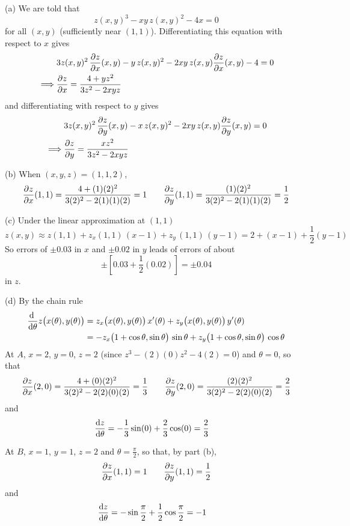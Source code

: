 \begin{solution}
(a)  We are told that
\begin{equation*}
z(x,y)^3 - xy\,z(x,y)^2 - 4x = 0
\end{equation*}
for all $(x,y)$ (sufficiently near $(1,1)$).
Differentiating this equation with respect to $x$ gives
\begin{align*}
& 3z(x,y)^2\,\pdiff{z}{x}(x,y) -y\, z(x,y)^2 -2xy\,z(x,y)\pdiff{z}{x}(x,y) - 4=0
\\ \implies 
&\pdiff{z}{x} = \frac{4+yz^2}{3z^2-2xyz}
\end{align*}
and differentiating with respect to $y$ gives
\begin{align*}
& 3z(x,y)^2\,\pdiff{z}{y}(x,y) -x\, z(x,y)^2 -2xy\,z(x,y)\pdiff{z}{y}(x,y) =0
\\ \implies 
&\pdiff{z}{y} = \frac{xz^2}{3z^2-2xyz}
\end{align*}

(b) 
When $(x,y,z)=(1,1,2)$,
\begin{align*}
\pdiff{z}{x}(1,1) = \frac{4+(1)(2)^2}{3(2)^2-2(1)(1)(2)} = 1\qquad
\pdiff{z}{y}(1,1) = \frac{(1)(2)^2}{3(2)^2-2(1)(1)(2)} = \frac{1}{2}
\end{align*}

(c) Under the linear approximation at $(1,1)$
\begin{equation*}
z(x,y) \approx z(1,1) + z_x(1,1)\,(x-1) + z_y\,(1,1)\,(y-1)
        = 2 + (x-1) +\frac{1}{2}(y-1)
\end{equation*}
So errors of $\pm 0.03$ in $x$ and $\pm 0.02$ in $y$ leads of errors
of about 
\begin{equation*}
\pm\left[0.03 + \frac{1}{2}(0.02)\right]
=\pm 0.04
\end{equation*}
in $z$.

(d) By the chain rule
\begin{align*}
\diff{}{\theta} z\big(x(\theta),y(\theta)\big)
&= z_x\big(x(\theta),y(\theta)\big)\,x'(\theta)
  +z_y\big(x(\theta),y(\theta)\big)\,y'(\theta) \\
&=-z_x\big(1 + \cos\theta,\sin\theta\big)\,\sin\theta
  +z_y\big(1 + \cos\theta,\sin\theta\big)\,\cos\theta
\end{align*}
At $A$, $x=2$, $y=0$, $z=2$ (since $z^3-(2)(0)z^2-4(2)=0$) and $\theta=0$, 
so that
\begin{align*}
\pdiff{z}{x}(2,0) = \frac{4+(0)(2)^2}{3(2)^2-2(2)(0)(2)} = \frac{1}{3}\qquad
\pdiff{z}{y}(2,0) = \frac{(2)(2)^2}{3(2)^2-2(2)(0)(2)} = \frac{2}{3}
\end{align*}
and
\begin{align*}
\diff{z}{\theta} 
&=-\frac{1}{3}\sin(0) +\frac{2}{3}\cos(0) =\frac{2}{3}
\end{align*}

At $B$, $x=1$, $y=1$, $z=2$ and $\theta=\frac{\pi}{2}$, 
so that, by part (b),
\begin{align*}
\pdiff{z}{x}(1,1) = 1\qquad
\pdiff{z}{y}(1,1) = \frac{1}{2}
\end{align*}
and
\begin{align*}
\diff{z}{\theta} 
&=-\sin\frac{\pi}{2} +\frac{1}{2}\cos\frac{\pi}{2} = -1
\end{align*}
\end{solution}

